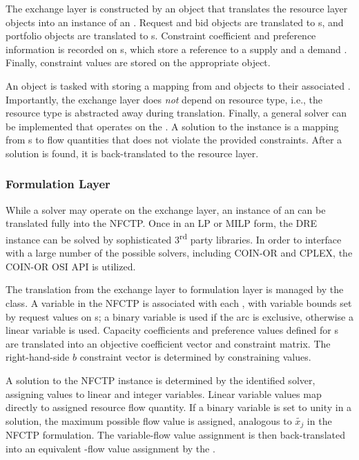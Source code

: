 The exchange layer is constructed by an  object that
translates the resource layer objects into an instance of an
. Request and bid objects are translated to
s, and portfolio objects are translated to
s. Constraint coefficient and preference information is
recorded on s, which store a reference to a supply
 and a demand . Finally, constraint values
are stored on the appropriate  object.

An  object is tasked with storing a mapping from
 and  objects to their associated
. Importantly, the exchange layer does \textit{not} depend on
resource type, i.e., the resource type is abstracted away during
translation. Finally, a general solver can be implemented that operates on the
. A solution to the  instance is a
mapping from s to flow quantities that does not violate the
provided constraints. After a solution is found, it is back-translated to the
resource layer.

\subsubsection{Formulation Layer}

While a solver may operate on the exchange layer, an instance of an
 can be translated fully into the NFCTP. Once in an LP or
MILP form, the DRE instance can be solved by sophisticated 3\textsuperscript{rd}
party libraries. In order to interface with a large number of the possible
solvers, including COIN-OR and CPLEX, the COIN-OR OSI API \cite{coinosi} is
utilized.

The translation from the exchange layer to formulation layer is managed by the
 class. A variable in the NFCTP is associated with each
, with variable bounds set by request values on
s; a binary variable is used if the arc is exclusive,
otherwise a linear variable is used. Capacity coefficients and preference values
defined for s are translated into an objective coefficient
vector and constraint matrix. The right-hand-side $b$ constraint vector is
determined by  constraining values.

A solution to the NFCTP instance is determined by the identified solver,
assigning values to linear and integer variables. Linear variable values map
directly to assigned resource flow quantity. If a binary variable is set to
unity in a solution, the maximum possible flow value is assigned, analogous to
$\tilde{x_j}$ in the NFCTP formulation. The variable-flow value assignment is
then back-translated into an equivalent -flow value assignment
by the .

